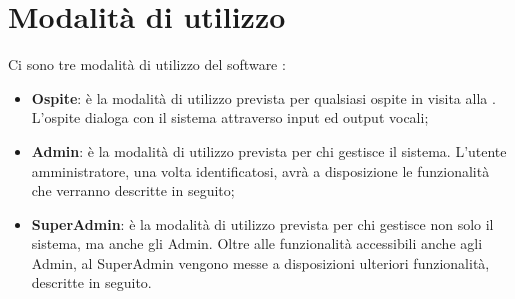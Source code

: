 \documentclass[../ManualeUtente_v1.0.0.tex]{subfiles}
\begin{document}
\section{Modalità di utilizzo}

	Ci sono tre modalità di utilizzo del software \atavi:
	\begin{itemize}
		\item{\textbf{Ospite}: è la modalità di utilizzo prevista per qualsiasi ospite in visita alla \prop. L'ospite dialoga con il sistema attraverso input ed output vocali;}
		\item{\textbf{Admin}: è la modalità di utilizzo prevista per chi gestisce il sistema. L'utente amministratore, una volta identificatosi, avrà a disposizione le funzionalità che verranno descritte in seguito;}
		\item{\textbf{SuperAdmin}: è la modalità di utilizzo prevista per chi gestisce non solo il sistema, ma anche gli Admin. Oltre alle funzionalità accessibili anche agli Admin, al SuperAdmin vengono messe a disposizioni ulteriori funzionalità, descritte in seguito.}
	\end{itemize}
	
\end{document}
